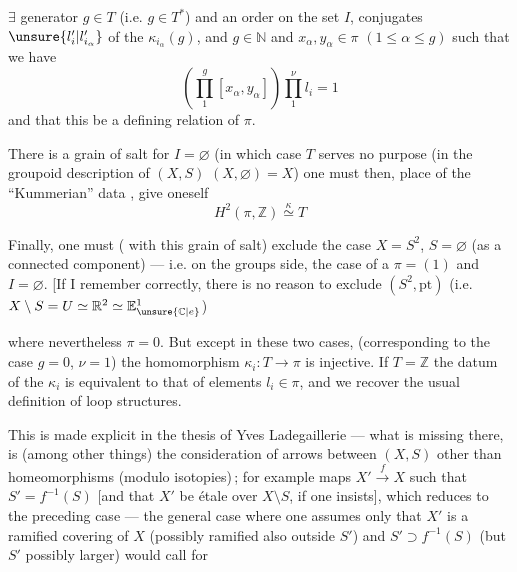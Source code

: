 
$\exists$ generator $g\in T$ (i.e. $g\in T^*$) and an order 
on the set $I$,  conjugates
$\unsure{l_i'|l_{i_\alpha}'}$ of the $\kappa_{i_\alpha}(g)$, and $g\in\mathbb N$ and $x_\alpha,y_\alpha\in\pi$
$(1\leq\alpha\leq g)$ such that we have
\[
\left(\prod_1^g[x_\alpha,y_\alpha]\right)\prod_1^{\nu}l_i=1
\]
and that this be a defining relation
of $\pi$.

There is  a grain of salt for $I=\varnothing$
(in which case $T$ serves no purpose  (in the
groupoid description of $(X,S)$ \unsure{$\simeq$|$=$} $(X,\varnothing)=X$)
one must then,  place of the
``Kummerian'' data \inserted{$\kappa$}, give oneself
\[
H^2(\pi,\mathbb Z)\overset{\kappa}{\simeq}T
\]

Finally, one must 
( with this grain of salt) exclude the case $X=S^2$, $S=\varnothing$
(as a connected component) --- i.e.
on the groups side, the case of a 
$\pi=(1)$  and $I=\varnothing$.
[If I remember correctly, there is no reason
to exclude $(S^2,\mathrm{pt})$ (i.e. $X\setminus S=U\simeq\mathbb R^2\simeq\mathbb E^1_{\unsure{\mathbb C|e}}$)


where nevertheless  $\pi=0$. But except in these
two cases,  (corresponding
to the case $g=0$, $\nu=1$) the homomorphism $\kappa_i:T\longrightarrow\pi$
is injective. If $T=\mathbb Z$ the datum of the $\kappa_i$
is equivalent to that of elements $l_i\in\pi$, and we
recover the usual definition of
loop structures.

This is made explicit in the thesis of
Yves Ladegaillerie --- what is missing there, is
(among other things) the consideration of arrows
between $(X,S)$ other than homeomorphisms
(modulo isotopies)\,; for example maps 
 $X'\xrightarrow{f}X$ such that $S'=f^{-1}(S)$
[and that $X'$ be étale over $X\setminus S$, if one insists\unsure{!}],
which reduces to the preceding case
--- the  general case where one assumes only
that $X'$ is a ramified covering
of $X$ (possibly ramified also
outside $S'$) and $S'\supset f^{-1}(S)$ (but $S'$
possibly larger) would call for


